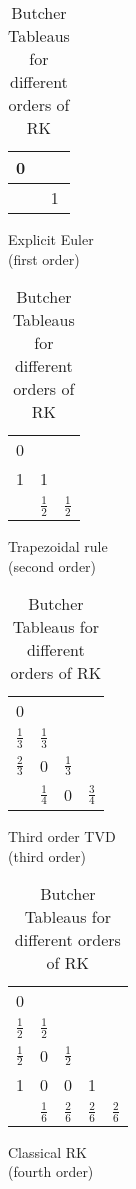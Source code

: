 \begin{table}
	\centering
	\def\arraystretch{1.5}
	\begin{subfigure}[b]{0.18\textwidth}		
		\begin{tabular}{l|c}	
			0 & \\
			\hline
			& 1
		\end{tabular}
		\caption{Explicit Euler \\(first order)}
	\end{subfigure}
	\centering
	\begin{subfigure}[b]{0.24\textwidth}		
		\begin{tabular}{l|c c}	
			0 & &\\
			1 & 1 & \\
			\hline
			& $\tfrac{1}{2}$ & $\tfrac{1}{2}$\\
		\end{tabular}
		\caption{Trapezoidal rule \\(second order)}
	\end{subfigure}
	\centering
	\begin{subfigure}[b]{0.26\textwidth}		
		\begin{tabular}{l|c c c}	
			0 & & &\\
			$\tfrac{1}{3}$ &$\tfrac{1}{3}$& &\\
			$\tfrac{2}{3}$ & 0 & $\tfrac{1}{3}$ & \\
			\hline
			& $\tfrac{1}{4}$ & 0 & $\tfrac{3}{4}$\\
		\end{tabular}
		\caption{Third order TVD \\(third order)}
	\end{subfigure}
	\centering
	\begin{subfigure}[b]{0.29\textwidth}		
		\begin{tabular}{l|c c c c}	
			0 & & & &\\
			$\tfrac{1}{2}$ &$\tfrac{1}{2}$& & &\\
			$\tfrac{1}{2}$ & 0 & $\tfrac{1}{2}$ & &\\
			1 & 0 & 0 & 1 &\\
			\hline
			& $\tfrac{1}{6}$ & $\tfrac{2}{6}$ & $\tfrac{2}{6}$ & $\tfrac{2}{6}$\\
		\end{tabular}
		\caption{Classical RK \\(fourth order)}
	\end{subfigure}
	\caption{Butcher Tableaus for different orders of RK}
	\label{RKtableaus}
\end{table}		
	

